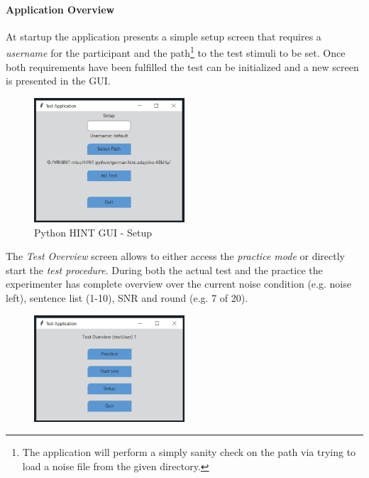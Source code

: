 \documentclass[a4paper,11pt]{article}%
\renewcommand{\\}{\vspace*{0.5\baselineskip} \newline}
\begin{document}
{{\paragraph{Application Overview} At startup the application presents a simple setup screen that requires a \textit{username} for the participant and the path\footnote{The application will perform a simply sanity check on the path via trying to load a noise file from the given directory.} to the test stimuli to be set. Once both requirements have been fulfilled the test can be initialized and a new screen is presented in the \ac{GUI}.
\begin{figure}[h!]
	\centering
	\includegraphics[width=0.5\textwidth]{PythonHINT-Setup.png}
	\caption{Python HINT GUI - Setup}
	\label{fig:pyhint-setup}
\end{figure}
\newline
\newline
The \textit{Test Overview} screen allows to either access the \textit{practice mode} or directly start the \textit{test procedure}. During both the actual test and the practice the experimenter has complete overview over the current noise condition (e.g. \dq noise left\dq{}), sentence list (1-10), \ac{SNR} and round (e.g. 7 of 20).
\begin{figure}[h!]
	\centering
	\includegraphics[width=0.5\textwidth]{PythonHINT-Overview.png}

\end{figure}}}
\end{document}
